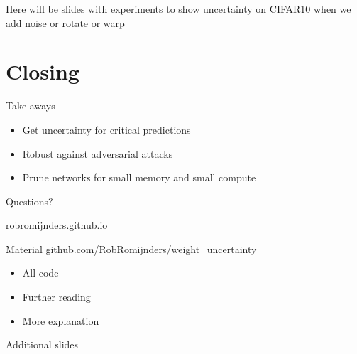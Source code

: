 \documentclass{beamer}
\newcommand{\mdlink}[2]{\href{#2}{\underline{#1}}}
\begin{document}

\else

\begin{frame}
	Here will be slides with experiments to show uncertainty on CIFAR10 when we add noise or rotate or warp
\end{frame}

\fi

\section{Closing}
\begin{frame}
	\centerline{Take aways}
	\begin{itemize}
		\item Get uncertainty for critical predictions
		\item Robust against adversarial attacks
		\item Prune networks for small memory and small compute
	\end{itemize}
\end{frame}

\begin{frame}
	\centerline{\Huge{Questions?}}
		
	\centerline{  }
	\centerline{\mdlink{robromijnders.github.io}{http://robromijnders.github.io/}}
	\centerline{  }
		
	\begin{block}{Material}
		\mdlink{\url{github.com/RobRomijnders/weight_uncertainty}}{github.com/RobRomijnders/weight_uncertainty}
		\centerline{  }
		\begin{itemize}
			\item All code
			\item Further reading
			\item More explanation
		\end{itemize}
	\end{block}
\end{frame}

\begin{frame}
	\centerline{\Huge{Additional slides}}
\end{frame}
\end{document}
